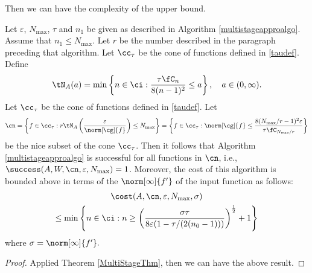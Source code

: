Then we can have the complexity of the upper bound.
\begin{theorem}   Let  $\varepsilon$, $N_{\max}$, $\tau$ and $n_1$ be given as described in Algorithm \ref{multistageapproalgo}.
Assume that $n_1 \le N_{\max}$. Let $r$ be the number described in the paragraph preceding that algorithm.
Let $\cc_\tau$ be the cone of functions defined in \eqref{taudef}.
Define
\[
\tN_A(a) = \min\left\{ n \in \ci : \frac{\tau \fC_n }{8(n-1)^2} \le a \right\}, \quad a \in (0,\infty).
\]
Let $\cc_\tau$ be the cone of functions defined in \eqref{taudef}.  Let
$$
\cn = \left \{ f \in \cc_\tau :r\tN_{A}\left(\frac{\varepsilon}{\norm[\cg]{f}} \right) \le N_{\max} \right\}
= \left \{ f \in \cc_\tau : \norm[\cg]{f} \le \frac{8(N_{\max}/r-1)^2 \varepsilon }{\tau \fC_{N_{\max}/r}  } \right\}
$$
be the nice subset of the cone $\cc_\tau$.  Then it follows that Algorithm \ref{multistageapproalgo} is successful for all functions in $\cn$,  i.e.,  $\success(A,W,\cn,\varepsilon,N_{\max}) = 1$.  Moreover, the cost of this algorithm is bounded above in terms of the $\norm[\infty]{f'}$ of the input function as follows:
\begin{multline}
\cost(A,\cn,\varepsilon,N_{\max},\sigma) \\
\le  \min\left\{ n \in \ci : n \ge \left(\frac{\sigma\tau}{8\varepsilon(1 - \tau/(2(n_{0}-1)))}\right)^{\frac{1}{2}} +1\right\}
\end{multline} where $\sigma=\norm[\infty]{f'}.$
\end{theorem}

\begin{proof}
Applied Theorem \ref{MultiStageThm}, then we can have the above result.
\end{proof}





